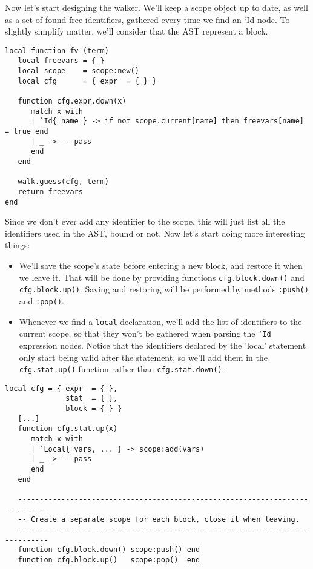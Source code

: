 Now let's start designing the walker. We'll keep a scope object up to date, as
well as a set of found free identifiers, gathered every time we find an `Id{ }
node. To slightly simplify matter, we'll consider that the AST represent a
block.

\begin{Verbatim}[fontsize=\scriptsize]
local function fv (term)
   local freevars = { }
   local scope    = scope:new()
   local cfg      = { expr  = { } }

   function cfg.expr.down(x)
      match x with
      | `Id{ name } -> if not scope.current[name] then freevars[name] = true end
      | _ -> -- pass
      end
   end

   walk.guess(cfg, term)
   return freevars
end
\end{Verbatim}

Since we don't ever add any identifier to the scope, this will just list all the
identifiers used in the AST, bound or not. Now let's start doing more
interesting things:

\begin{itemize}
\item We'll save the scope's state before entering a new block, and restore it
  when we leave it. That will be done by providing functions {\tt cfg.block.down()}
  and {\tt cfg.block.up()}. Saving and restoring will be performed by methods
  {\tt :push()} and {\tt :pop()}.
\item Whenever we find a {\tt local} declaration, we'll add the list of
  identifiers to the current scope, so that they won't be gathered when parsing
  the {\tt `Id} expression nodes. Notice that the identifiers declared by the
  'local' statement only start being valid after the statement, so we'll add
  them in the {\tt cfg.stat.up()} function rather than {\tt cfg.stat.down()}.
\end{itemize}

\begin{Verbatim}[fontsize=\scriptsize]
local cfg = { expr  = { },
              stat  = { },
              block = { } }
   [...]
   function cfg.stat.up(x)
      match x with
      | `Local{ vars, ... } -> scope:add(vars)
      | _ -> -- pass
      end
   end

   -----------------------------------------------------------------------------
   -- Create a separate scope for each block, close it when leaving.
   -----------------------------------------------------------------------------
   function cfg.block.down() scope:push() end
   function cfg.block.up()   scope:pop()  end  
\end{Verbatim}

